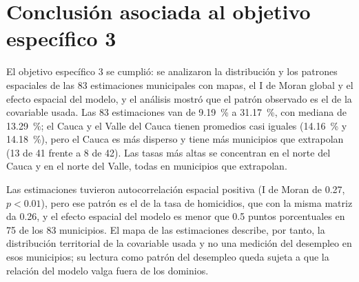\section{Conclusión asociada al objetivo específico 3}

El objetivo específico 3 se cumplió: se analizaron la distribución y los patrones espaciales de las 83 estimaciones municipales con mapas, el I de Moran global y el efecto espacial del modelo, y el análisis mostró que el patrón observado es el de la covariable usada. Las 83 estimaciones van de 9.19~\% a 31.17~\%, con mediana de 13.29~\%; el Cauca y el Valle del Cauca tienen promedios casi iguales (14.16~\% y 14.18~\%), pero el Cauca es más disperso y tiene más municipios que extrapolan (13 de 41 frente a 8 de 42). Las tasas más altas se concentran en el norte del Cauca y en el norte del Valle, todas en municipios que extrapolan.

Las estimaciones tuvieron autocorrelación espacial positiva (I de Moran de 0.27, $p < 0.01$), pero ese patrón es el de la tasa de homicidios, que con la misma matriz da 0.26, y el efecto espacial del modelo es menor que 0.5 puntos porcentuales en 75 de los 83 municipios. El mapa de las estimaciones describe, por tanto, la distribución territorial de la covariable usada y no una medición del desempleo en esos municipios; su lectura como patrón del desempleo queda sujeta a que la relación del modelo valga fuera de los dominios.
